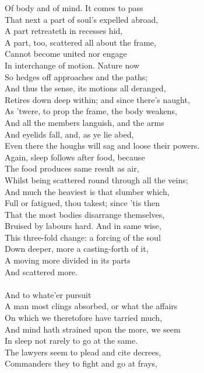 Of body and of mind. It comes to pass\\
That next a part of soul's expelled abroad,\\
A part retreateth in recesses hid,\\
A part, too, scattered all about the frame,\\
Cannot become united nor engage\\
In interchange of motion. Nature now\\
So hedges off approaches and the paths;\\
And thus the sense, its motions all deranged,\\
Retires down deep within; and since there's naught,\\
As 'twere, to prop the frame, the body weakens,\\
And all the members languish, and the arms\\
And eyelids fall, and, as ye lie abed,\\
Even there the houghs will sag and loose their powers.\\
Again, sleep follows after food, because\\
The food produces same result as air,\\
Whilst being scattered round through all the veins;\\
And much the heaviest is that slumber which,\\
Full or fatigued, thou takest; since 'tis then\\
That the most bodies disarrange themselves,\\
Bruised by labours hard. And in same wise,\\
This three-fold change: a forcing of the soul\\
Down deeper, more a casting-forth of it,\\
A moving more divided in its parts\\
And scattered more.\\
\\
And to whate'er pursuit\\
A man most clings absorbed, or what the affairs\\
On which we theretofore have tarried much,\\
And mind hath strained upon the more, we seem\\
In sleep not rarely to go at the same.\\
The lawyers seem to plead and cite decrees,\\
Commanders they to fight and go at frays,\\
